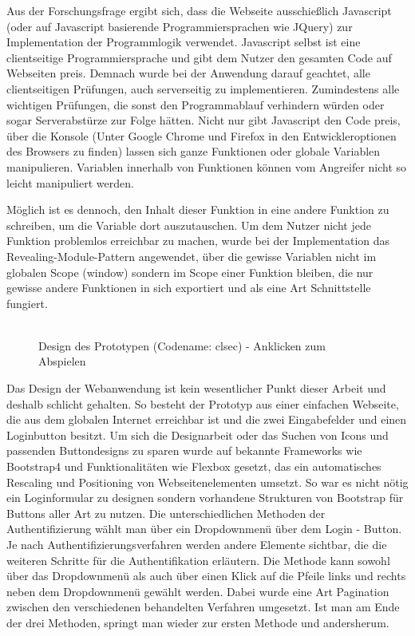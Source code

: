 \begin{enumerate}
Aus der Forschungsfrage ergibt sich, dass die Webseite ausschießlich Javascript (oder auf Javascript basierende Programmiersprachen wie JQuery) zur Implementation der Programmlogik verwendet. Javascript selbst ist eine clientseitige Programmiersprache und gibt dem Nutzer den gesamten Code auf Webseiten preis. Demnach wurde bei der Anwendung darauf geachtet, alle clientseitigen Prüfungen, auch serverseitig zu implementieren. Zumindestens alle wichtigen Prüfungen, die sonst den Programmablauf verhindern würden oder sogar Serverabstürze zur Folge hätten. Nicht nur gibt Javascript den Code preis, über die Konsole (Unter Google Chrome und Firefox in den Entwickleroptionen des Browsers zu finden) lassen sich ganze Funktionen oder globale Variablen manipulieren. Variablen innerhalb von Funktionen können vom Angreifer nicht so leicht manipuliert werden.

Möglich ist es dennoch, den Inhalt dieser Funktion in eine andere Funktion zu schreiben, um die Variable dort auszutauschen. Um dem Nutzer nicht jede Funktion problemlos erreichbar zu machen, wurde bei der Implementation das Revealing-Module-Pattern angewendet, über die gewisse Variablen nicht im globalen Scope (window) sondern im Scope einer Funktion bleiben, die nur gewisse andere Funktionen in sich exportiert und als eine Art Schnittstelle fungiert. \\\\

\begin{figure}[ht]
	\centering
	\caption[Design des Prototypen (Codename: clsec)]{Design des Prototypen (Codename: clsec) - Anklicken zum Abspielen}
	\label{fig:webapp_design}
\end{figure}
\newpage

Das Design der Webanwendung ist kein wesentlicher Punkt dieser Arbeit und deshalb schlicht gehalten. So besteht der Prototyp aus einer einfachen Webseite, die aus dem globalen Internet erreichbar ist und die zwei Eingabefelder und einen Loginbutton besitzt. Um sich die Designarbeit oder das Suchen von Icons und passenden Buttondesigns zu sparen wurde auf bekannte Frameworks wie Bootstrap4 und Funktionalitäten wie Flexbox gesetzt, das ein automatisches Rescaling und Positioning von Webseitenelementen umsetzt. So war es nicht nötig ein Loginformular zu designen sondern vorhandene Strukturen von Bootstrap für Buttons aller Art zu nutzen. Die unterschiedlichen Methoden der Authentifizierung wählt man über ein Dropdownmenü über dem Login - Button. Je nach Authentifizierungsverfahren werden andere Elemente sichtbar, die die weiteren Schritte für die Authentifikation erläutern. Die Methode kann sowohl über das Dropdownmenü als auch über einen Klick auf die Pfeile links und rechts neben dem Dropdownmenü gewählt werden. Dabei wurde eine Art Pagination zwischen den verschiedenen behandelten Verfahren umgesetzt. Ist man am Ende der drei Methoden, springt man wieder zur ersten Methode und andersherum.


\end{enumerate}
